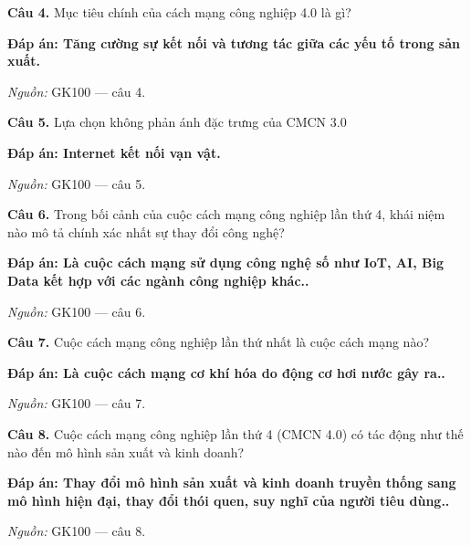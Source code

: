 \documentclass[11pt,a4paper]{article}
\begin{document}
\textbf{Câu 4.} Mục tiêu chính của cách mạng công nghiệp 4.0 là gì?\par
{\color{answer}\textbf{Đáp án: Tăng cường sự kết nối và tương tác giữa các yếu tố trong sản xuất.}}\par
{\footnotesize\color{sourcegray}\textit{Nguồn:} GK100 — câu 4.\par}
\vspace{3pt}\par\noindent{\color{black!18}\rule{\linewidth}{0.3pt}}\par\medskip

\textbf{Câu 5.} Lựa chọn không phản ánh đặc trưng của CMCN 3.0\par
{\color{answer}\textbf{Đáp án: Internet kết nối vạn vật.}}\par
{\footnotesize\color{sourcegray}\textit{Nguồn:} GK100 — câu 5.\par}
\vspace{3pt}\par\noindent{\color{black!18}\rule{\linewidth}{0.3pt}}\par\medskip

\textbf{Câu 6.} Trong bối cảnh của cuộc cách mạng công nghiệp lần thứ 4, khái niệm nào mô tả chính xác nhất sự thay đổi công nghệ?\par
{\color{answer}\textbf{Đáp án: Là cuộc cách mạng sử dụng công nghệ số như IoT, AI, Big Data kết hợp với các ngành công nghiệp khác..}}\par
{\footnotesize\color{sourcegray}\textit{Nguồn:} GK100 — câu 6.\par}
\vspace{3pt}\par\noindent{\color{black!18}\rule{\linewidth}{0.3pt}}\par\medskip

\textbf{Câu 7.} Cuộc cách mạng công nghiệp lần thứ nhất là cuộc cách mạng nào?\par
{\color{answer}\textbf{Đáp án: Là cuộc cách mạng cơ khí hóa do động cơ hơi nước gây ra..}}\par
{\footnotesize\color{sourcegray}\textit{Nguồn:} GK100 — câu 7.\par}
\vspace{3pt}\par\noindent{\color{black!18}\rule{\linewidth}{0.3pt}}\par\medskip

\textbf{Câu 8.} Cuộc cách mạng công nghiệp lần thứ 4 (CMCN 4.0) có tác động như thế nào đến mô hình sản xuất và kinh doanh?\par
{\color{answer}\textbf{Đáp án: Thay đổi mô hình sản xuất và kinh doanh truyền thống sang mô hình hiện đại, thay đổi thói quen, suy nghĩ của người tiêu dùng..}}\par
{\footnotesize\color{sourcegray}\textit{Nguồn:} GK100 — câu 8.\par}
\vspace{3pt}\par\noindent{\color{black!18}\rule{\linewidth}{0.3pt}}\par\medskip
\end{document}
